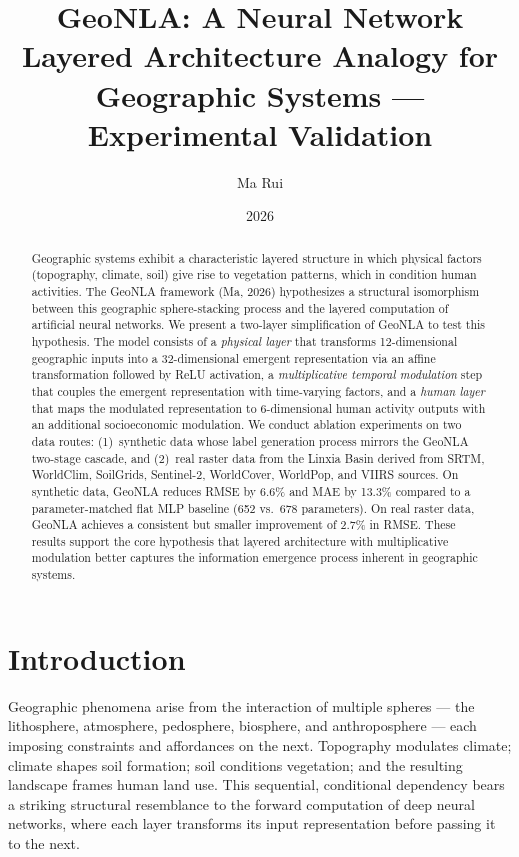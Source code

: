 \documentclass[a4paper,11pt]{article}
\title{\textbf{GeoNLA: A Neural Network Layered Architecture Analogy for Geographic Systems --- Experimental Validation}}
\author{Ma Rui}
\date{2026}
\begin{document}
\maketitle

\begin{abstract}
Geographic systems exhibit a characteristic layered structure in which physical factors (topography, climate, soil) give rise to vegetation patterns, which in condition human activities. The GeoNLA framework (Ma, 2026) hypothesizes a structural isomorphism between this geographic sphere-stacking process and the layered computation of artificial neural networks. We present a two-layer simplification of GeoNLA to test this hypothesis. The model consists of a \emph{physical layer} that transforms 12-dimensional geographic inputs into a 32-dimensional emergent representation via an affine transformation followed by ReLU activation, a \emph{multiplicative temporal modulation} step that couples the emergent representation with time-varying factors, and a \emph{human layer} that maps the modulated representation to 6-dimensional human activity outputs with an additional socioeconomic modulation. We conduct ablation experiments on two data routes: (1)~synthetic data whose label generation process mirrors the GeoNLA two-stage cascade, and (2)~real raster data from the Linxia Basin derived from SRTM, WorldClim, SoilGrids, Sentinel-2, WorldCover, WorldPop, and VIIRS sources. On synthetic data, GeoNLA reduces RMSE by 6.6\% and MAE by 13.3\% compared to a parameter-matched flat MLP baseline (652 vs.\ 678 parameters). On real raster data, GeoNLA achieves a consistent but smaller improvement of 2.7\% in RMSE. These results support the core hypothesis that layered architecture with multiplicative modulation better captures the information emergence process inherent in geographic systems.
\end{abstract}

\section{Introduction}
\label{sec:introduction}

Geographic phenomena arise from the interaction of multiple spheres --- the lithosphere, atmosphere, pedosphere, biosphere, and anthroposphere --- each imposing constraints and affordances on the next. Topography modulates climate; climate shapes soil formation; soil conditions vegetation; and the resulting landscape frames human land use. This sequential, conditional dependency bears a striking structural resemblance to the forward computation of deep neural networks, where each layer transforms its input representation before passing it to the next.
\end{document}
